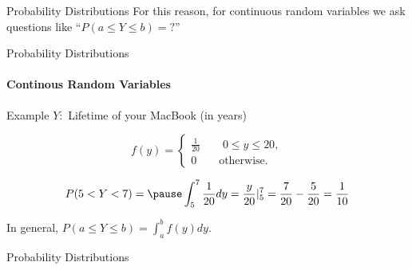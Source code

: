 \documentclass{beamer}\usepackage[]{graphicx}\usepackage[]{color}
\begin{document}
\begin{darkframes}
\begin{frame}[label=lists]{Probability Distributions}
      For this reason, for continuous random variables we ask questions like ``$P(a \leq Y \leq b)=?$'' \newline \pause			
	\end{frame}


	\begin{frame}[label=lists]{Probability Distributions}
		\framesubtitle{Continous Random Variables} 

		\begin{exampleblock}{Example}
		$Y:$ Lifetime of your MacBook (in years) \pause
		
		$$ f(y) = 
			\begin{cases}
				\frac{1}{20} \qquad 0 \leq y \leq 20, \\
				0 \qquad   \text{otherwise.}
			\end{cases}
		$$  \pause
				
		$$
			P(5<Y<7) = \pause \int_5^7 \frac{1}{20} dy = \frac{y}{20} |_5^7 = \frac{7}{20} - \frac{5}{20} =  \frac{1}{10}
		$$  \pause
		
		
		\end{exampleblock}
		
		In general, \alert{$P(a \leq Y \leq b) = \int_a^b f(y)dy$}.
				
	\end{frame}




	\begin{frame}[label=lists]{Probability Distributions}
		\begin{figure} 
			\centering
			\setlength\fboxsep{0pt}
			\setlength\fboxrule{0.5pt}
		\end{figure} 


				
	\end{frame}
	

\end{darkframes}
\end{document}
